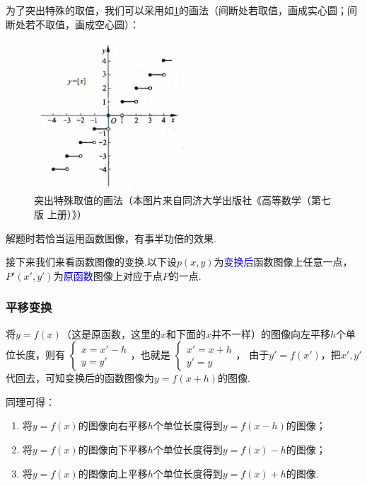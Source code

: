 \documentclass[lang=cn,math=cm,chinesefont=nofont,11pt,scheme=chinese,twocol]{elegantbook}
\begin{document}
为了突出特殊的取值，我们可以采用如\ref{img:2.1.5function6}的画法（间断处若取值，画成实心圆；间断处若不取值，画成空心圆）：

\begin{figure}[h]
  \centering
  \includegraphics[width=0.5\textwidth]{image/2.1.5function6.png}
  \caption{突出特殊取值的画法（本图片来自同济大学出版社《高等数学（第七版 上册）》）}
  \label{img:2.1.5function6}
\end{figure}

解题时若恰当运用函数图像，有事半功倍的效果.

接下来我们来看函数图像的变换.以下设$p(x,y)$为\textcolor{blue}{变换后}函数图像上任意一点，$P'(x',y')$为\textcolor{blue}{原函数}图像上对应于点$P$的一点.

\subsubsection{平移变换}

将$y=f(x)$（这是原函数，这里的$x$和下面的$x$并不一样）的图像向左平移$h$个单位长度，则有
$\begin{cases}
  x=x'-h
  \\y=y'
\end{cases}$，也就是
$\begin{cases}
  x'=x+h
  \\y'=y
\end{cases}$，
由于$y'=f(x')$，把$x',y'$代回去，可知变换后的函数图像为$y=f(x+h)$的图像.

同理可得：

\begin{enumerate}
  \item 将$y=f(x)$的图像向右平移$h$个单位长度得到$y=f(x-h)$的图像；
  \item 将$y=f(x)$的图像向下平移$h$个单位长度得到$y=f(x)-h$的图像；
  \item 将$y=f(x)$的图像向上平移$h$个单位长度得到$y=f(x)+h$的图像.
\end{enumerate}
\end{document}
